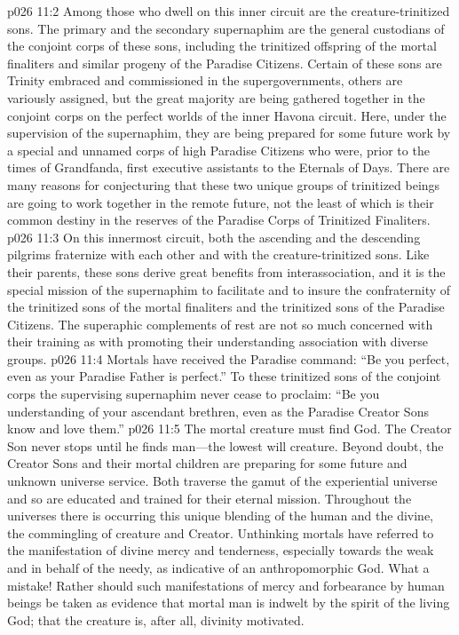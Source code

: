 \pc \vs p026 11:2 Among those who dwell on this inner circuit are the creature\hyp{}trinitized sons. The primary and the secondary supernaphim are the general custodians of the conjoint corps of these sons, including the trinitized offspring of the mortal finaliters and similar progeny of the Paradise Citizens. Certain of these sons are Trinity embraced and commissioned in the supergovernments, others are variously assigned, but the great majority are being gathered together in the conjoint corps on the perfect worlds of the inner Havona circuit. Here, under the supervision of the supernaphim, they are being prepared for some future work by a special and unnamed corps of high Paradise Citizens who were, prior to the times of Grandfanda, first executive assistants to the Eternals of Days. There are many reasons for conjecturing that these two unique groups of trinitized beings are going to work together in the remote future, not the least of which is their common destiny in the reserves of the Paradise Corps of Trinitized Finaliters.
\vs p026 11:3 On this innermost circuit, both the ascending and the descending pilgrims fraternize with each other and with the creature\hyp{}trinitized sons. Like their parents, these sons derive great benefits from interassociation, and it is the special mission of the supernaphim to facilitate and to insure the confraternity of the trinitized sons of the mortal finaliters and the trinitized sons of the Paradise Citizens. The superaphic complements of rest are not so much concerned with their training as with promoting their understanding association with diverse groups.
\vs p026 11:4 Mortals have received the Paradise command: “Be you perfect, even as your Paradise Father is perfect.” To these trinitized sons of the conjoint corps the supervising supernaphim never cease to proclaim: “Be you understanding of your ascendant brethren, even as the Paradise Creator Sons know and love them.”
\pc \vs p026 11:5 The mortal creature must find God. The Creator Son never stops until he finds man---the lowest will creature. Beyond doubt, the Creator Sons and their mortal children are preparing for some future and unknown universe service. Both traverse the gamut of the experiential universe and so are educated and trained for their eternal mission. Throughout the universes there is occurring this unique blending of the human and the divine, the commingling of creature and Creator. Unthinking mortals have referred to the manifestation of divine mercy and tenderness, especially towards the weak and in behalf of the needy, as indicative of an anthropomorphic God. What a mistake! Rather should such manifestations of mercy and forbearance by human beings be taken as evidence that mortal man is indwelt by the spirit of the living God; that the creature is, after all, divinity motivated.
